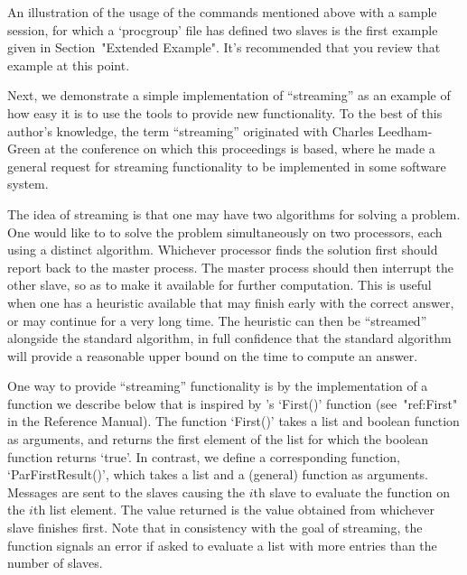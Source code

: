 An illustration of the usage of  the  commands  mentioned  above  with  a
sample {\ParGAP} session, for which a `procgroup' file  has  defined  two
slaves is the first example given  in  Section~"Extended  Example".  It's
recommended that you review that example at this point.


Next, we demonstrate a  simple  implementation  of  ``streaming''  as  an
example of how easy it is to use  the  {\ParGAP}  tools  to  provide  new
functionality.  To  the  best  of  this  author's  knowledge,  the   term
``streaming'' originated with Charles Leedham-Green at the conference  on
which this proceedings is based, where he  made  a  general  request  for
streaming functionality to be implemented in some software system.

The idea of streaming is that one may have two algorithms for  solving  a
problem. One would like to to solve the  problem  simultaneously  on  two
processors, each using a distinct algorithm.  Whichever  processor  finds
the solution first should report back to the master process.  The  master
process should then interrupt the other slave, so as to make it available
for further  computation.  This  is  useful  when  one  has  a  heuristic
available that may finish early with the correct answer, or may  continue
for a very long time. The heuristic can then  be  ``streamed''  alongside
the standard algorithm, in full confidence that  the  standard  algorithm
will provide a reasonable upper bound on the time to compute an answer.

One way to provide ``streaming'' functionality is by  the  implementation
of a function we describe below that is inspired  by  {\GAP}'s  `First()'
function (see~"ref:First" in the {\GAP} Reference Manual).  The  function
`First()' takes a list and boolean function as arguments, and returns the
first element of the list for which the boolean function returns  `true'.
In   contrast,   we   define   a   corresponding   {\ParGAP}    function,
`ParFirstResult()', which takes  a  list  and  a  (general)  function  as
arguments. Messages are sent to the slaves causing  the  $i$th  slave  to
evaluate the function on the $i$th list element. The  value  returned  is
the value obtained from whichever slave  finishes  first.  Note  that  in
consistency with the goal of streaming, the function signals an error  if
asked to evaluate a list with more entries than the number of slaves.

